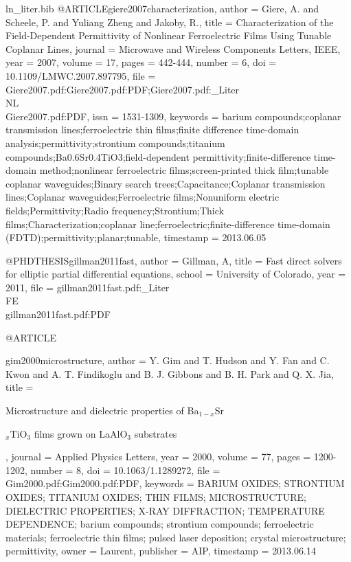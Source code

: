 \begin{filecontents*}{ln_liter.bib}
@ARTICLE{giere2007characterization,
  author = {Giere, A. and Scheele, P. and Yuliang Zheng and Jakoby, R.},
  title = {Characterization of the Field-Dependent Permittivity of Nonlinear
	Ferroelectric Films Using Tunable Coplanar Lines},
  journal = {Microwave and Wireless Components Letters, IEEE},
  year = {2007},
  volume = {17},
  pages = {442-444},
  number = {6},
  doi = {10.1109/LMWC.2007.897795},
  file = {Giere2007.pdf:Giere2007.pdf:PDF;Giere2007.pdf:_Liter\\NL\\Giere2007.pdf:PDF},
  issn = {1531-1309},
  keywords = {barium compounds;coplanar transmission lines;ferroelectric thin films;finite
	difference time-domain analysis;permittivity;strontium compounds;titanium
	compounds;Ba0.6Sr0.4TiO3;field-dependent permittivity;finite-difference
	time-domain method;nonlinear ferroelectric films;screen-printed thick
	film;tunable coplanar waveguides;Binary search trees;Capacitance;Coplanar
	transmission lines;Coplanar waveguides;Ferroelectric films;Nonuniform
	electric fields;Permittivity;Radio frequency;Strontium;Thick films;Characterization;coplanar
	line;ferroelectric;finite-difference time-domain (FDTD);permittivity;planar;tunable},
  timestamp = {2013.06.05}
}

@PHDTHESIS{gillman2011fast,
  author = {Gillman, A},
  title = {Fast direct solvers for elliptic partial differential equations},
  school = {University of Colorado},
  year = {2011},
  file = {gillman2011fast.pdf:_Liter\\FE\\gillman2011fast.pdf:PDF}
}

@ARTICLE{gim2000microstructure,
  author = {Y. Gim and T. Hudson and Y. Fan and C. Kwon and A. T. Findikoglu
	and B. J. Gibbons and B. H. Park and Q. X. Jia},
  title = {Microstructure and dielectric properties of {Ba}$_{1 - x}${Sr}
	
	$_x${TiO}$_3$ films grown on {LaAlO}$_3$ substrates},
  journal = {Applied Physics Letters},
  year = {2000},
  volume = {77},
  pages = {1200-1202},
  number = {8},
  doi = {10.1063/1.1289272},
  file = {Gim2000.pdf:Gim2000.pdf:PDF},
  keywords = {BARIUM OXIDES; STRONTIUM OXIDES; TITANIUM OXIDES; THIN FILMS; MICROSTRUCTURE;
	DIELECTRIC PROPERTIES; X-RAY DIFFRACTION; TEMPERATURE DEPENDENCE;
	barium compounds; strontium compounds; ferroelectric materials; ferroelectric
	thin films; pulsed laser deposition; crystal microstructure; permittivity},
  owner = {Laurent},
  publisher = {AIP},
  timestamp = {2013.06.14}
}


\end{filecontents*}
